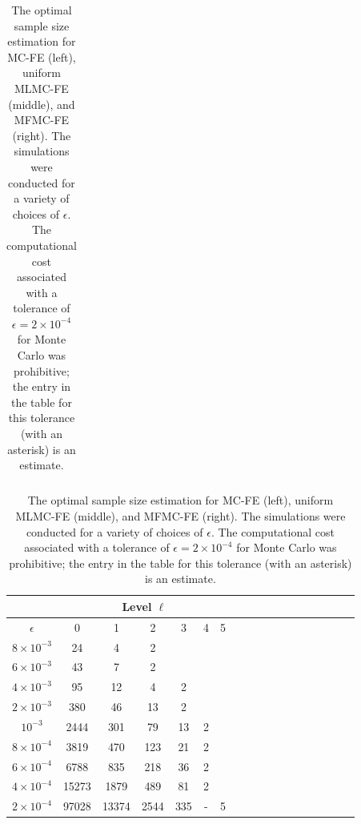 \begin{table}[ht]
{\begin{tabular}{c|c|c|c|c|c|c|c|c|c|c|c|c|}
			\hline
	\end{tabular}
 \qquad
		\begin{tabular}{c|c|c|c|c|c|c|c|c|c|c|c|c|c|c|c|c|c|}
	    \cline{2-7}	
		&\multicolumn{6}{|c|}{ Level $\ell$}\\
			\hline
			\multicolumn{1}{|c|}{$\epsilon$}&0&1&2&3&4&5\\
			\hline
			\multicolumn{1}{|c|}{$8\times 10^{-3} $}&24&4&2&&&\\
			\multicolumn{1}{|c|}{$6\times 10^{-3} $}&43&7&2&&&\\
			\multicolumn{1}{|c|}{$4\times 10^{-3} $}&95&12&4&2&&\\
			\multicolumn{1}{|c|}{$2\times 10^{-3} $}&380&46&13&2&&\\
			\multicolumn{1}{|c|}{$10^{-3} $}&2444&301&79&13&2&\\
			\multicolumn{1}{|c|}{$8\times 10^{-4} $}&3819&470&123&21&2&\\
                \multicolumn{1}{|c|}{$6\times 10^{-4} $}&6788&835&218&36&2&\\
			\multicolumn{1}{|c|}{$4\times 10^{-4} $}&15273&1879&489&81&2&\\
                \multicolumn{1}{|c|}{$2\times 10^{-4} $}&97028&13374&2544&335&-&5\\
			\hline
	\end{tabular}
 
 }
	\caption{The optimal sample size estimation for MC-FE (left), uniform MLMC-FE (middle), and MFMC-FE (right). The simulations were conducted for a variety of choices of $\epsilon$. The computational cost associated with a tolerance of $\epsilon = 2\times 10^{-4}$ for Monte Carlo was prohibitive; the entry in the table for this tolerance (with an asterisk) is an estimate.}
	\label{Tab:SampleSize}
\end{table}
%

